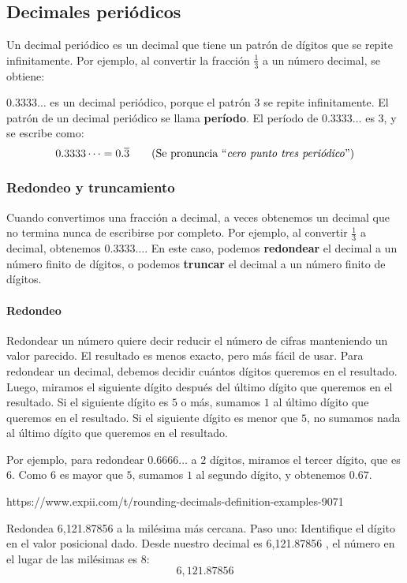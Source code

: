 \documentclass[12pt]{book}
\begin{document}
\begin{mainmatter}
    \subsection{Decimales peri\'odicos}
    Un decimal periódico es un decimal que tiene un patrón de dígitos que se repite infinitamente. Por ejemplo, al convertir la fracción $\frac{1}{3}$ a un número decimal, se obtiene:
    \begin{center}
    \end{center}
    $0.3333\dots$ es un decimal periódico, porque el patrón $3$ se repite infinitamente. El patrón de un decimal periódico se llama \textbf{período}. El período de $0.3333\dots$ es $3$, y se escribe como:
    \[0.3333\dots=0.\overline{3} \qquad \text{(Se pronuncia ``\emph{cero punto tres periódico}'')}\]

    \subsubsection{Redondeo y truncamiento}
    Cuando convertimos una fracción a decimal, a veces obtenemos un decimal que no termina nunca de escribirse por completo. Por ejemplo, al convertir $\frac{1}{3}$ a decimal, obtenemos $0.3333\dots$. En este caso, podemos \textbf{redondear} el decimal a un número finito de dígitos, o podemos \textbf{truncar} el decimal a un número finito de dígitos.

    \paragraph{Redondeo} Redondear un número quiere decir reducir el número de cifras manteniendo un valor parecido. El resultado es menos exacto, pero más fácil de usar. Para redondear un decimal, debemos decidir cuántos dígitos queremos en el resultado. Luego, miramos el siguiente dígito después del último dígito que queremos en el resultado. Si el siguiente dígito es $5$ o más, sumamos $1$ al último dígito que queremos en el resultado. Si el siguiente dígito es menor que $5$, no sumamos nada al último dígito que queremos en el resultado.

    Por ejemplo, para redondear $0.6666\dots$ a $2$ dígitos, miramos el tercer dígito, que es $6$. Como $6$ es mayor que $5$, sumamos $1$ al segundo dígito, y obtenemos $0.67$.

    https://www.expii.com/t/rounding-decimals-definition-examples-9071

    Redondea 6,121.87856 a la milésima más cercana.
    Paso uno: Identifique el dígito en el valor posicional dado. Desde nuestro decimal
    es 6,121.87856 , el número en el lugar de las milésimas es 8:
    \[6,121.87\boxed{8}56\]



\end{mainmatter}
\end{document}
